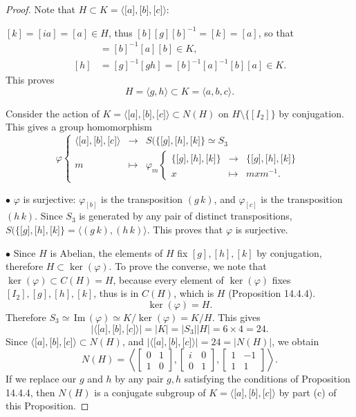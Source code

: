 \documentclass[11pt,a4paper]{article}
\newcommand{\im}{\,\mathrm{Im}\,}
\begin{document}
{\begin{proof}
Note that $H \subset K = \langle {[}a{]},{[}b{]},{[}c{]} \rangle$:

$[k] = [ia] = [a] \in H$, thus $[b][g][b]^{-1} = [k] = [a]$, so that
\begin{align*}
[g] &= [b]^{-1} [a][b] \in K,\\
[h] &= [g]^{-1} [gh] =[b]^{-1}[a]^{-1} [b] [a] \in K.
\end{align*}
This proves $$H = \langle g,h \rangle \subset K = \langle a,b,c \rangle.$$

Consider the action of $K =\langle {[}a{]},{[}b{]},{[}c{]} \rangle  \subset N(H)$ on $H\setminus\{[I_2]\}$ by conjugation. This gives a group homomorphism
$$
\varphi
\left\{
\begin{array}{ccc}
\langle {[}a{]},{[}b{]},{[}c{]} \rangle & \to & S(\{{[}g{]},{[}h{]},{[}k{]}\} \simeq S_3\\
m & \mapsto &\varphi_m
    \left\{
    \begin{array}{ccc}
    \{{[}g{]},{[}h{]},{[}k{]}\} & \to & \{{[}g{]},{[}h{]},{[}k{]}\} \\
    x &\mapsto & mxm^{-1}.
    \end{array}
    \right.
\end{array}
\right.
$$

\item[$\bullet$] $\varphi$ is surjective: $\varphi_{[b]}$ is the transposition $(g\, k)$, and $\varphi_{[c]}$ is the transposition $(h\,k)$. Since $S_3$ is generated by any pair of distinct transpositions, $S(\{{[}g{]},{[}h{]},{[}k{]}\} = \langle (g\, k), (h\,k) \rangle$. This proves that $\varphi$ is surjective.

\item[$\bullet$] Since $H$ is Abelian, the elements of $H$ fix $[g],[h],[k]$ by conjugation, therefore $H \subset \ker(\varphi)$. To prove the converse, we note that $\ker(\varphi) \subset C(H) = H$, because every element of $\ker(\varphi)$ fixes $[I_2], [g],[h],[k]$, thus is in $C(H)$, which is $H$ (Proposition 14.4.4).
$$\ker(\varphi) = H.$$
Therefore $S_3 \simeq \im(\varphi) \simeq K/\ker(\varphi) = K/H$. This gives
$$|\langle {[}a{]},{[}b{]},{[}c{]} \rangle | = |K| = |S_3| |H| = 6 \times 4 = 24. $$
Since $\langle {[}a{]},{[}b{]},{[}c{]} \rangle \subset N(H)$, and $|\langle {[}a{]},{[}b{]},{[}c{]} \rangle | = 24 = |N(H)|$, we obtain 
$$N(H) = \left \langle
\begin{bmatrix} 0 & 1\\1 & 0\end{bmatrix}, \begin{bmatrix} i & 0\\0 & 1 \end{bmatrix},  \begin{bmatrix} 1 & -1\\1 & 1 \end{bmatrix}
 \right \rangle.
$$
If we replace our $g$ and $h$ by any pair $g,h$ satisfying the conditions of Proposition 14.4.4, then $N(H)$ is a conjugate subgroup of $K = \langle {[}a{]},{[}b{]},{[}c{]} \rangle$ by part (c) of this Proposition.


\end{proof}}
\end{document}
